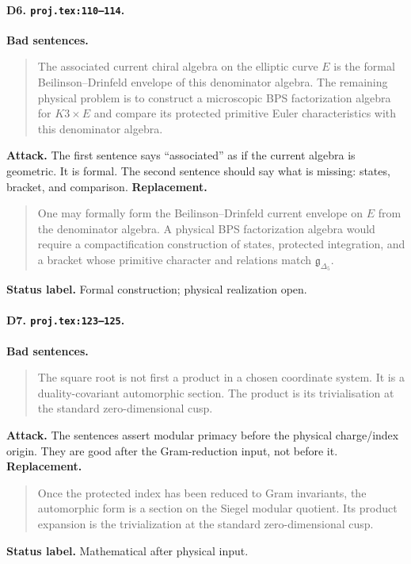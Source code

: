 \paragraph{D6. \texttt{proj.tex:110--114}.}
\textbf{Bad sentences.}
\begin{quote}\small
The associated current chiral algebra on the elliptic curve \(E\) is the
formal Beilinson--Drinfeld envelope of this denominator algebra.  The
remaining physical problem is to construct a microscopic BPS
factorization algebra for \(K3\times E\) and compare its protected
primitive Euler characteristics with this denominator algebra.
\end{quote}
\textbf{Attack.}
The first sentence says ``associated'' as if the current algebra is
geometric.  It is formal.  The second sentence should say what is missing:
states, bracket, and comparison.
\textbf{Replacement.}
\begin{quote}\small
One may formally form the Beilinson--Drinfeld current envelope on \(E\)
from the denominator algebra.  A physical BPS factorization algebra would
require a compactification construction of states, protected integration,
and a bracket whose primitive character and relations match
\(\mathfrak g_{\Delta_5}\).
\end{quote}
\textbf{Status label.} Formal construction; physical realization open.

\paragraph{D7. \texttt{proj.tex:123--125}.}
\textbf{Bad sentences.}
\begin{quote}\small
The square root is not first a product in a chosen coordinate system.
It is a duality-covariant automorphic section.  The product is its
trivialisation at the standard zero-dimensional cusp.
\end{quote}
\textbf{Attack.}
The sentences assert modular primacy before the physical charge/index
origin.  They are good after the Gram-reduction input, not before it.
\textbf{Replacement.}
\begin{quote}\small
Once the protected index has been reduced to Gram invariants, the
automorphic form is a section on the Siegel modular quotient.  Its product
expansion is the trivialization at the standard zero-dimensional cusp.
\end{quote}
\textbf{Status label.} Mathematical after physical input.

